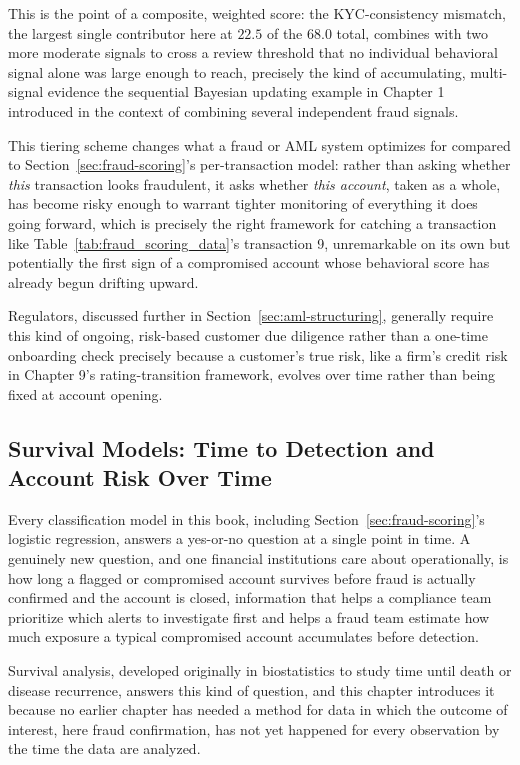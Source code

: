 \documentclass[../ai_in_finance]{subfiles}
\begin{document}
This is the point of a composite, weighted score: the KYC-consistency mismatch, the largest single contributor here at $22.5$ of the $68.0$ total, combines with two more moderate signals to cross a review threshold that no individual behavioral signal alone was large enough to reach, precisely the kind of accumulating, multi-signal evidence the sequential Bayesian updating example in Chapter 1 introduced in the context of combining several independent fraud signals.

This tiering scheme changes what a fraud or AML system optimizes for compared to Section~\ref{sec:fraud-scoring}'s per-transaction model: rather than asking whether \emph{this} transaction looks fraudulent, it asks whether \emph{this account}, taken as a whole, has become risky enough to warrant tighter monitoring of everything it does going forward, which is precisely the right framework for catching a transaction like Table~\ref{tab:fraud_scoring_data}'s transaction 9, unremarkable on its own but potentially the first sign of a compromised account whose behavioral score has already begun drifting upward.

Regulators, discussed further in Section~\ref{sec:aml-structuring}, generally require this kind of ongoing, risk-based customer due diligence rather than a one-time onboarding check precisely because a customer's true risk, like a firm's credit risk in Chapter 9's rating-transition framework, evolves over time rather than being fixed at account opening.

\subsection{Survival Models: Time to Detection and Account Risk Over Time}
\label{sec:survival-fraud}

Every classification model in this book, including Section~\ref{sec:fraud-scoring}'s logistic regression, answers a yes-or-no question at a single point in time. A genuinely new question, and one financial institutions care about operationally, is how long a flagged or compromised account survives before fraud is actually confirmed and the account is closed, information that helps a compliance team prioritize which alerts to investigate first and helps a fraud team estimate how much exposure a typical compromised account accumulates before detection.

Survival analysis, developed originally in biostatistics to study time until death or disease recurrence, answers this kind of question, and this chapter introduces it because no earlier chapter has needed a method for data in which the outcome of interest, here fraud confirmation, has not yet happened for every observation by the time the data are analyzed.
\end{document}
